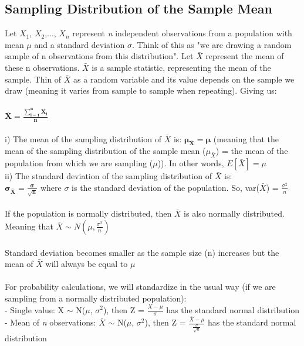 \documentclass[12pt, a4paper]{article}
\begin{document}
	\subsection{Sampling Distribution of the Sample Mean}
	Let $X_1$, $X_2$,..., $X_n$ represent \textit{n} independent observations from a population with mean $\mu$ and a standard deviation $\sigma$. Think of this as "we are drawing a random sample of n observations from this distribution". Let $\bar{X}$ represent the mean of these n observations. $\bar{X}$ is a sample statistic, representing the mean of the sample. Thin of $\bar{X}$ as a random variable and its value depends on the sample we draw (meaning it varies from sample to sample when repeating). Giving us: \\~\\
	\Large $\mathbf{\bar{X} = \frac{\sum_{i=1}^{n}X_i}{n}}$ \normalsize \\~\\
	\noindent i) The mean of the sampling distribution of $\bar{X}$ is: $\mathbf{\mu_{\bar{X}} = \mu}$ (meaning that the mean of the sampling distribution of the sample mean ($\mu_{\bar{X}}$) = the mean of the population from which we are sampling ($\mu$)). In other words, $E[\bar{X}] = \mu$ \\
	ii) The standard deviation of the sampling distribution of $\bar{X}$ is: \\ \hspace*{5mm} \large $\mathbf{\sigma_{\bar{X}} = \frac{\sigma}{\sqrt{n}}}$ \normalsize where $\sigma$ is the standard deviation of the population. So, var($\bar{X}$) = $\frac{\sigma^2}{n}$ \\~\\
	If the population is normally distributed, then $\bar{X}$ is also normally distributed. Meaning that $\bar{X} \sim N(\mu,\frac{\sigma^2}{n})$ \\~\\
	Standard deviation becomes smaller as the sample size (n) increases but the mean of $\bar{X}$ will always be equal to $\mu$ \\~\\
	For probability calculations, we will standardize in the usual way (if we are sampling from a normally distributed population): \\
	- Single value: X $\sim$ N($\mu$, $\sigma^2$), then Z = $\frac{X-\mu}{\sigma}$ has the standard normal distribution \\
	- Mean of \textit{n} observations: $\bar{X}$ $\sim$ N($\mu$, $\sigma^2$), then Z = $\frac{\bar{X}-\mu}{\frac{\sigma}{\sqrt{n}}}$ has the standard normal distribution \\~\\
\end{document}
